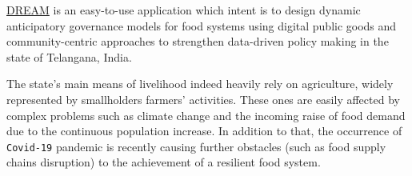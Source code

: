 

\hyperref[tab:acronymsTable]{DREAM} is an easy-to-use application which intent is \cite{grw_GitHub} to design dynamic anticipatory governance models for food systems using digital public goods and community-centric approaches to strengthen data-driven policy making in the state of Telangana, India.

The state's main means of livelihood indeed heavily rely on agriculture, widely represented by smallholders farmers' activities. These ones are easily affected by complex problems such as climate change and the incoming raise of food demand due to the continuous population increase. In addition to that, the occurrence of \texttt{Covid-19} pandemic is recently causing further obstacles (such as food supply chains disruption) to the achievement of a resilient food system.

